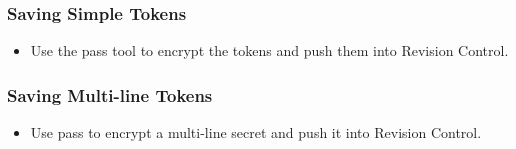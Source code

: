 \documentclass[aspectratio=169]{beamer}
\begin{document}
{
    \begin{frame}
    	\frametitle{Saving Simple Tokens}
    	\begin{itemize}
    		\item Use the pass tool to encrypt the tokens and push them into Revision Control.
    	\end{itemize}
    \end{frame}
    }

{
    \begin{frame}
	   \frametitle{Saving Multi-line Tokens}
	\begin{itemize}
		\item Use pass to encrypt a multi-line secret and push it into Revision Control.
	\end{itemize}
    \end{frame}
}
\end{document}
